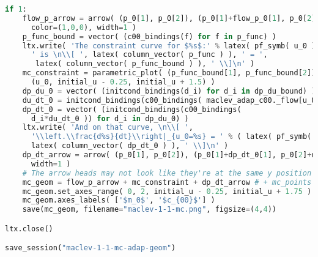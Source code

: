 \begin{lstlisting}[language=Python]
if 1:
    flow_p_arrow = arrow( (p_0[1], p_0[2]), (p_0[1]+flow_p_0[1], p_0[2]+flow_p_0[2]),
      color=(1,0,0), width=1 )
    p_func_bound = vector( (c00_bindings(f) for f in p_func) )
    ltx.write( 'The constraint curve for $%s$:' % latex( pf_symb( u_0 ) ),
      ' is \n\\[ ', latex( column_vector( p_func ) ), ' = ',
       latex( column_vector( p_func_bound ) ), ' \\]\n' )
    mc_constraint = parametric_plot( (p_func_bound[1], p_func_bound[2]),
      (u_0, initial_u - 0.25, initial_u + 1.5) )
    dp_du_0 = vector( (initcond_bindings(d_i) for d_i in dp_du_bound) )
    du_dt_0 = initcond_bindings(c00_bindings( maclev_adap_c00._flow[u_0] ) )
    dp_dt_0 = vector( (initcond_bindings(c00_bindings(
      d_i*du_dt_0 )) for d_i in dp_du_0) )
    ltx.write( 'And on that curve, \n\\[ ',
      '\\left.\\frac{d%s}{dt}\\right|_{u_0=%s} = ' % ( latex( pf_symb( u_0 ) ), latex( initial_u ) ),
      latex( column_vector( dp_dt_0 ) ), ' \\]\n' )
    dp_dt_arrow = arrow( (p_0[1], p_0[2]), (p_0[1]+dp_dt_0[1], p_0[2]+dp_dt_0[2]),
      width=1 )
    # The arrow heads may not look like they're at the same y position but they are
    mc_geom = flow_p_arrow + mc_constraint + dp_dt_arrow # + mc_points
    mc_geom.set_axes_range( 0, 2, initial_u - 0.25, initial_u + 1.75 )
    mc_geom.axes_labels( ['$m_0$', '$c_{00}$'] )
    save(mc_geom, filename="maclev-1-1-mc.png", figsize=(4,4))

ltx.close()

save_session("maclev-1-1-mc-adap-geom")
\end{lstlisting}
